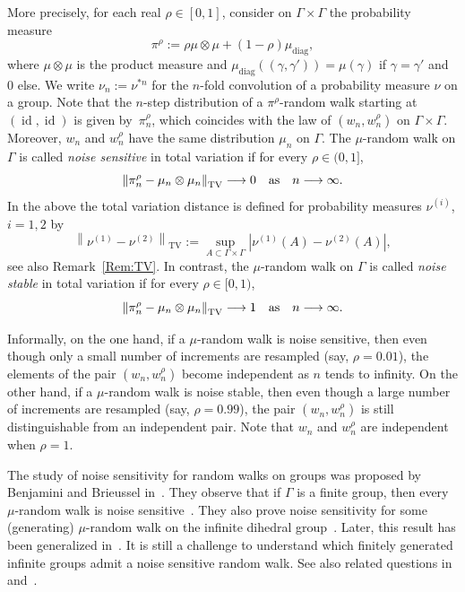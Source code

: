 \documentclass[10pt]{amsart}
\theoremstyle{definition}\newtheorem{defi}[theo]{Definition}\newtheorem{rema}[theo]{Remark}\newtheorem{exam}[theo]{Example}\newtheorem{exem}[theo]{Example}\newtheorem{nota}[theo]{Notation}
\DeclareMathOperator{\id}{id}
\DeclareMathOperator{\TV}{TV}
\DeclareMathOperator{\diag}{diag}
\newcommand{\m}{\mu}
\renewcommand{\(}{\left(}
\renewcommand{\)}{\right)}
\renewcommand*{\to}{\mathchoice{\longrightarrow}{\rightarrow}{\rightarrow}{\rightarrow}}
\begin{document}
More precisely, for each real $\rho \in [0, 1]$, consider on $\Gamma \times \Gamma$ the probability measure
\[
\pi^\rho:=\rho \mu \otimes \mu+(1-\rho)\mu_{\diag},
\]
where $\mu\otimes \mu$ is the product measure and $\mu_{\diag}((\gamma, \gamma'))=\mu(\gamma)$ if $\gamma=\gamma'$ and $0$ else. We write $\nu_n:=\nu^{\ast n}$ for the $n$-fold convolution of a probability measure $\nu$ on a group. Note that the $n$-step distribution of a $\pi^\rho$-random walk starting at $(\id, \id)$ is given by~$\pi^\rho_n$, which coincides with the law of $(w_n, w^\rho_n)$ on $\Gamma \times \Gamma$. Moreover, $w_n$ and $w^\rho_n$ have the same distribution $\m_n$ on $\Gamma$. The $\mu$-random walk on $\Gamma$ is called \emph{noise sensitive} in total variation if for every $\rho \in (0, 1]$,
\[
\left\|\pi^\rho_n-\mu_n\otimes \mu_n\right\|_{\TV} \to 0 \quad \text{as}\quad n \to \infty.
\]
In the above the total variation distance is defined for probability measures $\nu^{(i)}$, $i=1, 2$ by
\[
\left\|\nu^{(1)}-\nu^{(2)}\right\|_{\TV}:=\sup_{A \subset \Gamma \times \Gamma}\left|\nu^{(1)}(A)-\nu^{(2)}(A)\right|,
\]
see also Remark~\ref{Rem:TV}. In contrast, the $\mu$-random walk on $\Gamma$ is called \emph{noise stable} in total variation if for every $\rho \in [0, 1)$,
\[
\left\|\pi^\rho_n-\mu_n\otimes \mu_n\right\|_{\TV} \to 1 \quad \text{as}\quad n \to \infty.
\]

Informally, on the one hand, if a $\mu$-random walk is noise sensitive, then even though only a small number of increments are resampled (say, $\rho=0.01$), the elements of the pair $(w_n, w^\rho_n)$ become independent as $n$ tends to infinity. On the other hand, if a $\mu$-random walk is noise stable, then even though a large number of increments are resampled (say, $\rho=0.99$), the pair $(w_n, w^\rho_n)$ is still distinguishable from an independent pair. Note that $w_n$ and $w^\rho_n$ are independent when $\rho=1$.


The study of noise sensitivity for random walks on groups was proposed by Benjamini and Brieussel in~\cite{BenjaminiBrieussel}. They observe that if $\Gamma$ is a finite group, then every $\mu$-random walk is noise sensitive~\cite[Proposition~5.1]{BenjaminiBrieussel}. They also prove noise sensitivity for some (generating) $\mu$-random walk on the infinite dihedral group~\cite[Theorem~1.4]{BenjaminiBrieussel}. Later, this result has been generalized in~\cite{Tnss}. It is still a challenge to understand which finitely generated infinite groups admit a noise sensitive random walk. See also related questions in~\cite{BenjaminiBrieussel} and~\cite[Section~3.3.4]{KalaiICM2018}.
\end{document}
